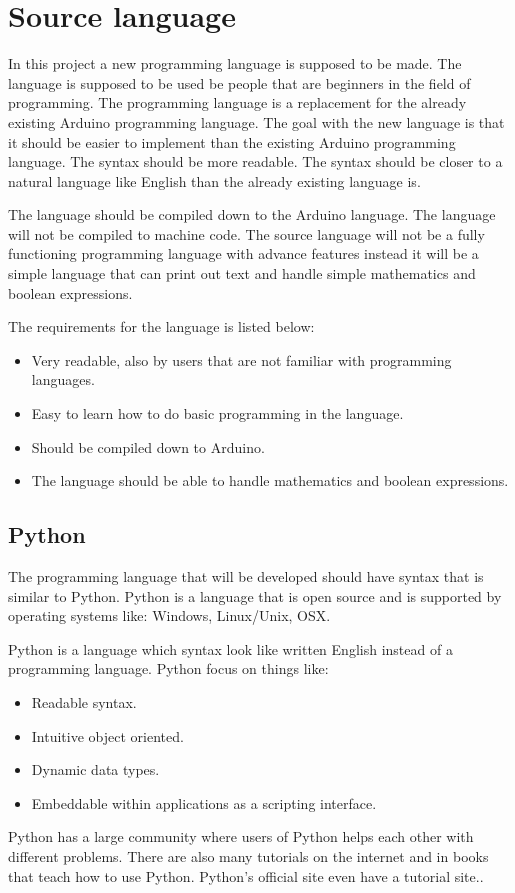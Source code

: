 \section{Source language}\label{analysis:source-language}
In this project a new programming language is supposed to be made. The language is supposed to be used be people that are beginners in the field of programming. The programming language is a replacement for the already existing Arduino programming language. 
The goal with the new language is that it should be easier to implement than the existing Arduino programming language. The syntax should be more readable. The syntax should be closer to a natural language like English than the already existing language is.

The language should be compiled down to the Arduino language. The language will not be compiled to machine code. The source language will not be a fully functioning programming language with advance features instead it will be a simple language that can print out text and handle simple mathematics and boolean expressions.

The requirements for the language is listed below:
\begin{itemize}
	\item Very readable, also by users that are not familiar with programming languages.
	\item Easy to learn how to do basic programming in the language.
	\item Should be compiled down to Arduino.
	\item The language should be able to handle mathematics and boolean expressions.
\end{itemize}

\subsection{Python}
The programming language that will be developed should have syntax that is similar to Python. Python is a language that is open source and is supported by operating systems like: Windows, Linux/Unix, OSX.

Python is a language which syntax look like written English instead of a programming language.
Python focus on things like:

\begin{itemize}
	\item Readable syntax.
	\item Intuitive object oriented.
	\item Dynamic data types.
	\item Embeddable within applications as a scripting interface.
\end{itemize} 
\cite{python:official:about}
Python has a large community where users of Python helps each other with different problems. There are also many tutorials on the internet and in books that teach how to use Python. Python's official site even have a tutorial site.\cite{python:official:tutorial}.